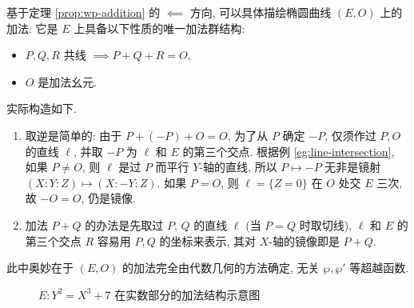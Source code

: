 \begin{remark}\label{rem:addition-by-lines}
	基于定理 \ref{prop:wp-addition} 的 $\impliedby$ 方向, 可以具体描绘椭圆曲线 $(E,O)$ 上的加法: 它是 $E$ 上具备以下性质的唯一加法群结构:
	\begin{itemize}
		\item $P,Q,R$ 共线 $\implies P + Q + R = O$,
		\item $O$ 是加法幺元.
	\end{itemize}
	实际构造如下.
	\begin{enumerate}
		\item 取逆是简单的: 由于 $P + (-P) + O = O$, 为了从 $P$ 确定 $-P$, 仅须作过 $P,O$ 的直线 $\ell$, 并取 $-P$ 为 $\ell$ 和 $E$ 的第三个交点. 根据例 \ref{eg:line-intersection}, 如果 $P \neq O$, 则 $\ell$ 是过 $P$ 而平行 $Y$-轴的直线, 所以 $P \mapsto -P$ 无非是镜射 $(X:Y:Z) \mapsto (X:-Y:Z)$. 如果 $P=O$, 则 $\ell = \{Z=0\}$ 在 $O$ 处交 $E$ 三次, 故 $-O = O$, 仍是镜像.
		\item 加法 $P+Q$ 的办法是先取过 $P$, $Q$ 的直线 $\ell$ (当 $P=Q$ 时取切线), $\ell$ 和 $E$ 的第三个交点 $R$ 容易用 $P,Q$ 的坐标来表示, 其对 $X$-轴的镜像即是 $P+Q$.
	\end{enumerate}
	此中奥妙在于 $(E,O)$ 的加法完全由代数几何的方法确定, 无关 $\wp, \wp'$ 等超越函数.
\end{remark}

\begin{figure}[h]\centering
	\caption{$E: Y^2 = X^3 + 7$ 在实数部分的加法结构示意图}
\end{figure}

